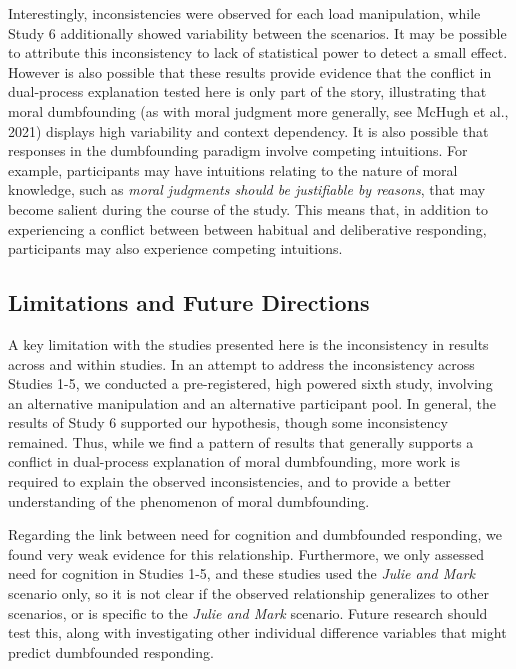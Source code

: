 \documentclass[
  american,
  man,floatsintext]{apa7}
\begin{document}
Interestingly, inconsistencies were observed for each load manipulation, while Study 6 additionally showed variability between the scenarios. It may be possible to attribute this inconsistency to lack of statistical power to detect a small effect. However is also possible that these results provide evidence that the conflict in dual-process explanation tested here is only part of the story, illustrating that moral dumbfounding (as with moral judgment more generally, see McHugh et al., 2021) displays high variability and context dependency. It is also possible that responses in the dumbfounding paradigm involve competing intuitions. For example, participants may have intuitions relating to the nature of moral knowledge, such as \emph{moral judgments should be justifiable by reasons}, that may become salient during the course of the study. This means that, in addition to experiencing a conflict between between habitual and deliberative responding, participants may also experience competing intuitions.

\hypertarget{limitations-and-future-directions}{%
\subsection{Limitations and Future Directions}\label{limitations-and-future-directions}}

A key limitation with the studies presented here is the inconsistency in results across and within studies. In an attempt to address the inconsistency across Studies 1-5, we conducted a pre-registered, high powered sixth study, involving an alternative manipulation and an alternative participant pool. In general, the results of Study 6 supported our hypothesis, though some inconsistency remained. Thus, while we find a pattern of results that generally supports a conflict in dual-process explanation of moral dumbfounding, more work is required to explain the observed inconsistencies, and to provide a better understanding of the phenomenon of moral dumbfounding.

Regarding the link between need for cognition and dumbfounded responding, we found very weak evidence for this relationship. Furthermore, we only assessed need for cognition in Studies 1-5, and these studies used the \emph{Julie and Mark} scenario only, so it is not clear if the observed relationship generalizes to other scenarios, or is specific to the \emph{Julie and Mark} scenario. Future research should test this, along with investigating other individual difference variables that might predict dumbfounded responding.
\end{document}
